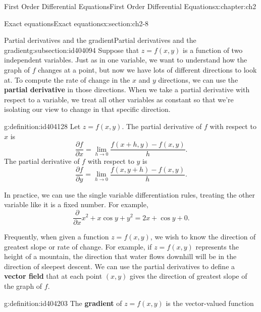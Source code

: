 \documentclass[oneside,10pt,]{book}
\newcommand{\terminology}[1]{\textbf{#1}}
\numberwithin{equation}{section}
\numberwithin{equation}{section}
\begin{document}
\begin{chapterptx}{First Order Differential Equations}{}{First Order Differential Equations}{}{}{x:chapter:ch2}
\begin{sectionptx}{Exact equations}{}{Exact equations}{}{}{x:section:ch2-8}
\begin{introduction}{}
\end{introduction}%
%
%
\typeout{************************************************}
\typeout{************************************************}
%
\begin{subsectionptx}{Partial derivatives and the gradient}{}{Partial derivatives and the gradient}{}{}{g:subsection:id404094}
Suppose that \(z = f(x,y)\) is a function of two independent variables. Just as in one variable, we want to understand how the graph of \(f\) changes at a point, but now we have lots of different directions to look at. To compute the rate of change in the \(x\) and \(y\) directions, we can use the \terminology{partial derivative} in those directions. When we take a partial derivative with respect to a variable, we treat all other variables as constant so that we're isolating our view to change in that specific direction.%
\begin{definition}{}{g:definition:id404128}%
Let \(z = f(x,y)\). The partial derivative of \(f\) with respect to \(x\) is%
\begin{equation*}
\frac{\partial f}{\partial x} = \lim_{h \to 0} \frac{f(x + h, y) - f(x,y)}{h}.
\end{equation*}
The partial derivative of \(f\) with respect to \(y\) is%
\begin{equation*}
\frac{\partial f}{\partial y} = \lim_{h\to 0}\frac{f(x, y+h) - f(x,y)}{h}.
\end{equation*}
%
\end{definition}
In practice, we can use the single variable differentiation rules, treating the other variable like it is a fixed number. For example,%
\begin{equation*}
\frac{\partial}{\partial x} x^2 + x \cos y + y^2 = 2x + \cos y + 0.
\end{equation*}
%
\par
Frequently, when given a function \(z = f(x,y)\), we wish to know the direction of greatest slope or rate of change. For example, if \(z = f(x,y)\) represents the height of a mountain, the direction that water flows downhill will be in the direction of sleepest descent. We can use the partial derivatives to define a \terminology{vector field} that at each point \((x,y)\) gives the direction of greatest slope of the graph of \(f\).%
\begin{definition}{}{g:definition:id404203}%
The \terminology{gradient} of \(z = f(x,y)\) is the vector-valued function%
\begin{equation*}

\end{equation*}
\end{definition}
\end{subsectionptx}
\end{sectionptx}
\end{chapterptx}
\end{document}
